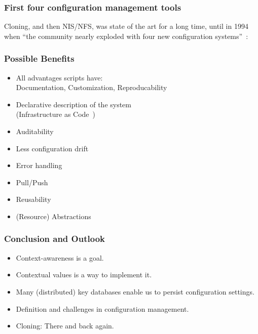 \begin{frame}
	\frametitle{First four configuration management tools}
	Cloning, and then NIS/NFS, was state of the art for a long time, until in 1994 when \enquote{the community nearly exploded with four new configuration systems}~\cite{evard1997analysis}:

\end{frame}

\begin{frame}
	\frametitle{Possible Benefits}

	\begin{itemize}[<+-| alert@+>]
	\item All advantages scripts have: \\
		Documentation, Customization, Reproducability
	\item Declarative description of the system \\
		(Infrastructure as Code~\cite{waldemar2013testing})
	\item Auditability
	\item Less configuration drift
	\item Error handling
	\item Pull/Push
	\item Reusability
	\item (Resource) Abstractions
	\end{itemize}
\end{frame}


\begin{frame}
	\frametitle{Conclusion and Outlook}

	\begin{itemize}[<+-| alert@+>]
	\item Context-awareness is a goal.
	\item Contextual values is a way to implement it.
	\item Many (distributed) key databases enable us to persist configuration settings.
	\item Definition and challenges in configuration management.
	\item Cloning: There and back again.
	\end{itemize}
\end{frame}






\nocite{raab2017introducing}

\appendix

\begin{frame}[allowframebreaks]
	
	
\end{frame}




